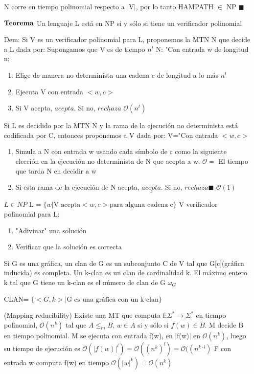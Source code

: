 \documentclass{homework}
\begin{document}
N corre en tiempo polinomial respecto a |V|, por lo tanto HAMPATH $\in$ NP $\blacksquare$

$\bf{Teorema}$ Un lenguaje L está en NP si y sólo si tiene un verificador polinomial 

Dem: Si V es un verificador polinomial para L, proponemos la MTN N que decide a L dada por:
Supongamos que V es de tiempo $n^{t}$
N: "Con entrada w de longitud n:
\begin{enumerate}
	\item Elige de manera no determinista una cadena c de longitud a lo más $n^t$
	\item Ejecuta V con entrada $<w,c>$
	\item Si V acepta, $\underline{acepta}$. Si no,  $\underline{rechaza}$ $\mathcal{O}(n^t)$
\end{enumerate}

Si L es decidido por la MTN N y la rama de la ejecución no determinista está codificada por C, entonces proponemos a V dada por:
V="Con entrada $<w,c>$
\begin{enumerate}
	\item Simula a N con entrada w usando cada símbolo de c como la siguiente elección en la ejecución no determinista de N que acepta a w. $\mathcal{O} =$ El tiempo que tarda N en decidir a w
	\item Si esta rama de la ejecución de N acepta, $\underline{acepta}$. Si no, $\underline{rechaza} \blacksquare$ $\mathcal{O}(1)$
\end{enumerate}

$L \in NP$
L = $\{w| \text{V acepta} <w,c> \text{para alguna cadena c}\}$
V verificador polinomial para L:
\begin{enumerate}
	\item "Adivinar" una solución
	\item Verificar que la solución es correcta
\end{enumerate}

Si G es una gráfica, un clan de G es un subconjunto C de V tal que G[c](gráfica inducida) es completa. Un k-clan es un clan de cardinalidad k. El máximo entero k tal que G tiene un k-clan es el número de clan de G $\omega_G$

CLAN= $\{<G,k>| \text{G es una gráfica con un k-clan}\}$

(Mapping reducibility)
Existe una MT que computa f:$ \Sigma^{*} \rightarrow \Sigma^{*}$ en tiempo polinomial, $\mathcal{O}(n^k)$ tal que $A \leq_m B$, $w \in A$ si y sólo si $f(w) \in B$. M decide B en tiempo polinomial.
M se ejecuta con entrada f(w), en |f(w)| en $\mathcal{O}(n^k)$, luego su tiempo de ejecución es $\mathcal{O}(|f(w)|^l) = \mathcal{O}((n^k)^l) = \mathcal{O}((n^{k \cdot l}) $ 
F con entrada w computa f(w) en tiempo $\mathcal{O}(|w|^k) = \mathcal{O}(n^k)$
\end{document}
